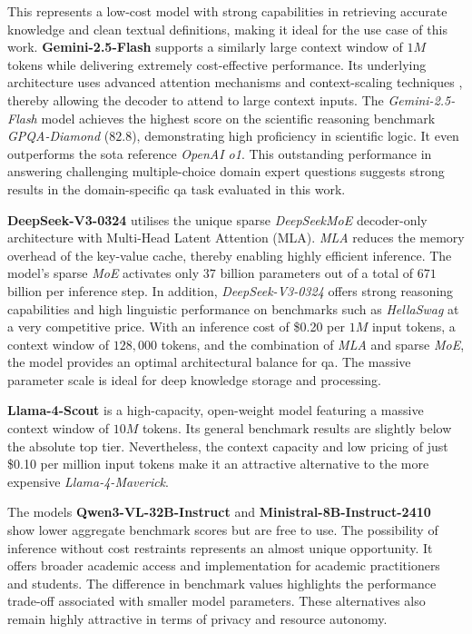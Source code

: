 This represents a low-cost model with strong capabilities in retrieving accurate knowledge and clean textual definitions, making it ideal for the use case of this work.
%
\textbf{Gemini-2.5-Flash} supports a similarly large context window of $1M$ tokens while delivering extremely cost-effective performance.
Its underlying architecture uses advanced attention mechanisms and context-scaling techniques \citep{Google2025Gemini2_5}, thereby allowing the decoder to attend to large context inputs.
The \textit{Gemini-2.5-Flash} model achieves the highest score on the scientific reasoning benchmark \textit{GPQA-Diamond} ($82.8$), demonstrating high proficiency in scientific logic.
It even outperforms the \ac{sota} reference \textit{OpenAI o1}.
This outstanding performance in answering challenging multiple-choice domain expert questions \citep{rein2023gpqagraduatelevelgoogleproofqa} suggests strong results in the domain-specific \ac{qa} task evaluated in this work.

\textbf{DeepSeek-V3-0324} utilises the unique sparse \textit{DeepSeekMoE} decoder-only architecture with Multi-Head Latent Attention (MLA).
\textit{MLA} reduces the memory overhead of the key-value cache, thereby enabling highly efficient inference.
The model's sparse \textit{MoE} activates only $37$ billion parameters out of a total of $671$ billion per inference step.
In addition, \textit{DeepSeek-V3-0324} offers strong reasoning capabilities and high linguistic performance on benchmarks such as \textit{HellaSwag} at a very competitive price.
With an inference cost of \$0.20 per $1M$ input tokens, a context window of $128,000$ tokens, and the combination of \textit{MLA} and sparse \textit{MoE}, the model provides an optimal architectural balance for \ac{qa}.
The massive parameter scale is ideal for deep knowledge storage and processing.

\textbf{Llama-4-Scout} is a high-capacity, open-weight model featuring a massive context window of $10M$ tokens.
Its general benchmark results are slightly below the absolute top tier.
Nevertheless, the context capacity and low pricing of just \$0.10 per million input tokens make it an attractive alternative to the more expensive \textit{Llama-4-Maverick}.

The models \textbf{Qwen3-VL-32B-Instruct} and \textbf{Ministral-8B-Instruct-2410} \\ show lower aggregate benchmark scores but are free to use.
The possibility of inference without cost restraints represents an almost unique opportunity.
It offers broader academic access and implementation for academic practitioners and students.
The difference in benchmark values highlights the performance trade-off associated with smaller model parameters.
These alternatives also remain highly attractive in terms of privacy and resource autonomy.

